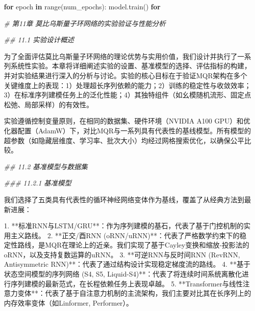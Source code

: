 \documentclass[
  12pt,
]{article}
\newenvironment{Shaded}{}{}
\newcommand{\BuiltInTok}[1]{#1}
\newcommand{\CommentTok}[1]{\textcolor[rgb]{0.38,0.63,0.69}{\textit{#1}}}
\newcommand{\ControlFlowTok}[1]{\textcolor[rgb]{0.00,0.44,0.13}{\textbf{#1}}}
\newcommand{\DecValTok}[1]{\textcolor[rgb]{0.25,0.63,0.44}{#1}}
\newcommand{\FloatTok}[1]{\textcolor[rgb]{0.25,0.63,0.44}{#1}}
\newcommand{\KeywordTok}[1]{\textcolor[rgb]{0.00,0.44,0.13}{\textbf{#1}}}
\newcommand{\NormalTok}[1]{#1}
\newcommand{\OperatorTok}[1]{\textcolor[rgb]{0.40,0.40,0.40}{#1}}
\begin{document}
\begin{Shaded}
\begin{Highlighting}[]
\ControlFlowTok{for}\NormalTok{ epoch }\KeywordTok{in} \BuiltInTok{range}\NormalTok{(num\_epochs):}
\NormalTok{    model.train()}
    \ControlFlowTok{for}

\CommentTok{\# 第11章 莫比乌斯量子环网络的实验验证与性能分析}

\CommentTok{\#\# 11.1 实验设计概述}

\NormalTok{为了全面评估莫比乌斯量子环网络的理论优势与实用价值，我们设计并执行了一系列系统性实验。本章将详细阐述实验的设置、基准模型的选择、评估指标的构建，并对实验结果进行深入的分析与讨论。实验的核心目标在于验证MQR架构在多个关键维度上的表现：}\DecValTok{1}\NormalTok{）处理超长序列依赖的能力；}\DecValTok{2}\NormalTok{）训练的稳定性与收敛效率；}\DecValTok{3}\NormalTok{）在标准序列建模任务上的泛化性能；}\DecValTok{4}\NormalTok{）其独特组件（如幺模随机流形、固定点松弛、局部采样）的有效性。}

\NormalTok{实验遵循控制变量原则，在相同的数据集、硬件环境（NVIDIA A100 GPU）和优化器配置（AdamW）下，对比MQR与一系列具有代表性的基线模型。所有模型的超参数（如隐藏层维度、学习率、批次大小）均经过网格搜索优化，以确保公平比较。}

\CommentTok{\#\# 11.2 基准模型与数据集}

\CommentTok{\#\#\# 11.2.1 基准模型}

\NormalTok{我们选择了五类具有代表性的循环神经网络变体作为基线，覆盖了从经典方法到最新进展：}

\FloatTok{1.}  \OperatorTok{**}\NormalTok{标准RNN与LSTM}\OperatorTok{/}\NormalTok{GRU}\OperatorTok{**}\NormalTok{：作为序列建模的基石，代表了基于门控机制的实用主义路线。}
\FloatTok{2.}  \OperatorTok{**}\NormalTok{正交}\OperatorTok{/}\NormalTok{酉RNN (oRNN}\OperatorTok{/}\NormalTok{uRNN)}\OperatorTok{**}\NormalTok{：代表了严格数学约束下的稳定性路线，是MQR在理论上的近亲。我们实现了基于Cayley变换和缩放}\OperatorTok{{-}}\NormalTok{投影法的oRNN，以及支持复数运算的uRNN。}
\FloatTok{3.}  \OperatorTok{**}\NormalTok{可逆RNN与反时间RNN (RevRNN, Antisymmetric RNN)}\OperatorTok{**}\NormalTok{：代表了通过结构设计实现稳定梯度流的路线。}
\FloatTok{4.}  \OperatorTok{**}\NormalTok{基于状态空间模型的序列网络 (S4, S5, Liquid}\OperatorTok{{-}}\NormalTok{S4)}\OperatorTok{**}\NormalTok{：代表了将连续时间系统离散化进行序列建模的最新范式，在长程依赖任务上表现卓越。}
\FloatTok{5.}  \OperatorTok{**}\NormalTok{Transformer与线性注意力变体}\OperatorTok{**}\NormalTok{：代表了基于自注意力机制的主流架构，我们主要对比其在长序列上的内存效率变体（如Linformer, Performer）。}


\end{Highlighting}
\end{Shaded}
\end{document}
